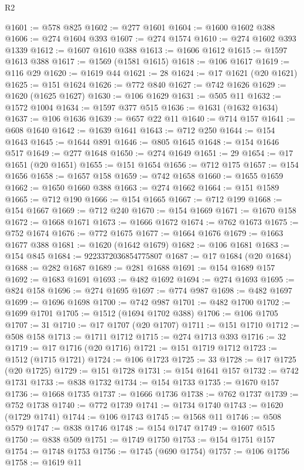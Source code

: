 \begin{lexlean}{R2}
\begin{coremodule}
@1601 := @578 @825
@1602 := @277 @1601
@1604 := @1600 @1602 @388
@1606 := @274 @1604 @393
@1607 := @274 @1574
@1610 := @274 @1602 @393 @1339
@1612 := @1607 @1610 @388
@1613 := @1606 @1612
@1615 := @1597 @1613 @388
@1617 := @1569 (@1581 @1615)
@1618 := @106 @1617
@1619 := @116 @29
@1620 := @1619 @44
@1621 := 28
@1624 := @17 @1621 (@20 @1621)
@1625 := @151 @1624
@1626 := @772 @840
@1627 := @742 @1626
@1629 := @1620 (@1625 @1627)
@1630 := @106 @1629
@1631 := @505 @11
@1632 := @1572 @1004
@1634 := @1597 @377 @515
@1636 := @1631 (@1632 @1634)
@1637 := @106 @1636
@1639 := @657 @22 @11
@1640 := @714 @157
@1641 := @608 @1640
@1642 := @1639 @1641
@1643 := @712 @250
@1644 := @154 @1643
@1645 := @1644 @891
@1646 := @805 @1645
@1648 := @154 @1646 @517
@1649 := @277 @1648
@1650 := @274 @1649
@1651 := 29
@1654 := @17 @1651 (@20 @1651)
@1655 := @151 @1654
@1656 := @712 @175
@1657 := @154 @1656
@1658 := @1657 @158
@1659 := @742 @1658
@1660 := @1655 @1659
@1662 := @1650 @1660 @388
@1663 := @274 @1662
@1664 := @151 @1589
@1665 := @712 @190
@1666 := @154 @1665
@1667 := @712 @199
@1668 := @154 @1667
@1669 := @712 @240
@1670 := @154 @1669
@1671 := @1670 @158
@1672 := @1668 @1671
@1673 := @1666 @1672
@1674 := @762 @1673
@1675 := @752 @1674
@1676 := @772 @1675
@1677 := @1664 @1676
@1679 := @1663 @1677 @388
@1681 := @1620 (@1642 @1679)
@1682 := @106 @1681
@1683 := @154 @845
@1684 := 9223372036854775807
@1687 := @17 @1684 (@20 @1684)
@1688 := @282 @1687
@1689 := @281 @1688
@1691 := @154 @1689 @157
@1692 := @1683 @1691
@1693 := @482 @1692
@1694 := @274 @1693
@1695 := @824 @158
@1696 := @274 @1695
@1697 := @774 @987
@1698 := @482 @1697
@1699 := @1696 @1698
@1700 := @742 @987
@1701 := @482 @1700
@1702 := @1699 @1701
@1705 := @1512 (@1694 @1702 @388)
@1706 := @106 @1705
@1707 := 31
@1710 := @17 @1707 (@20 @1707)
@1711 := @151 @1710
@1712 := @508 @158
@1713 := @1711 @1712
@1715 := @274 @1713 @393
@1716 := 32
@1719 := @17 @1716 (@20 @1716)
@1721 := @151 @1719 @1712
@1723 := @1512 (@1715 @1721)
@1724 := @106 @1723
@1725 := 33
@1728 := @17 @1725 (@20 @1725)
@1729 := @151 @1728
@1731 := @154 @1641 @157
@1732 := @742 @1731
@1733 := @838 @1732
@1734 := @154 @1733
@1735 := @1670 @157
@1736 := @1668 @1735
@1737 := @1666 @1736
@1738 := @762 @1737
@1739 := @752 @1738
@1740 := @772 @1739
@1741 := @1734 @1740
@1743 := @1620 (@1729 @1741)
@1744 := @106 @1743
@1745 := @1568 @11
@1746 := @508 @579
@1747 := @838 @1746
@1748 := @154 @1747
@1749 := @1607 @515
@1750 := @838 @509
@1751 := @1749 @1750
@1753 := @154 @1751 @157
@1754 := @1748 @1753
@1756 := @1745 (@690 @1754)
@1757 := @106 @1756
@1758 := @1619 @11

\end{coremodule}
\end{lexlean}
